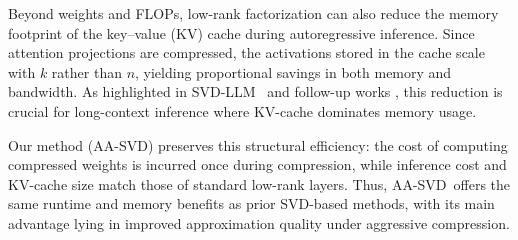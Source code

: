 \documentclass[10pt]{article} %
\theoremstyle{definition}
\theoremstyle{remark}
\newcommand{\ourmethodlight}{{\textsc{AA-SVD}}}
\begin{document}
Beyond weights and FLOPs, low-rank factorization can also reduce the memory footprint of the key–value (KV) cache during autoregressive inference.
Since attention projections are compressed, the activations stored in the cache scale with $k$ rather than $n$, yielding proportional savings in both memory and bandwidth.
As highlighted in SVD-LLM~\citep{wang2025svdllm} and follow-up works \citep{Wang2025DobiSVD,hu2026saes}, this reduction is crucial for long-context inference where KV-cache dominates memory usage.

Our method (\ourmethodlight) preserves this structural efficiency: the cost of computing compressed weights is incurred once during compression, while inference cost and KV-cache size match those of standard low-rank layers.
Thus, \ourmethodlight~offers the same runtime and memory benefits as prior SVD-based methods, with its main advantage lying in improved approximation quality under aggressive compression.





\end{document}
